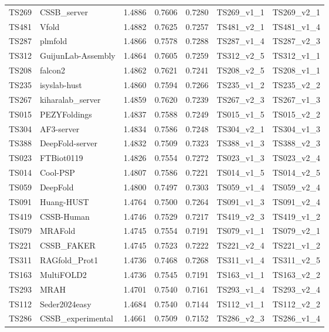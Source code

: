 \begin{table}[ht]
{\begin{tabular}{llrrrll}
TS269 & CSSB\_server & 1.4886 & 0.7606 & 0.7280 & TS269\_v1\_1 & TS269\_v2\_1 \\ 
TS481 & Vfold & 1.4882 & 0.7625 & 0.7257 & TS481\_v2\_1 & TS481\_v1\_4 \\ 
TS287 & plmfold & 1.4866 & 0.7578 & 0.7288 & TS287\_v1\_4 & TS287\_v2\_3 \\ 
TS312 & GuijunLab-Assembly & 1.4864 & 0.7605 & 0.7259 & TS312\_v2\_5 & TS312\_v1\_1 \\ 
TS208 & falcon2 & 1.4862 & 0.7621 & 0.7241 & TS208\_v2\_5 & TS208\_v1\_1 \\ 
TS235 & isyslab-hust & 1.4860 & 0.7594 & 0.7266 & TS235\_v1\_2 & TS235\_v2\_2 \\ 
TS267 & kiharalab\_server & 1.4859 & 0.7620 & 0.7239 & TS267\_v2\_3 & TS267\_v1\_3 \\ 
TS015 & PEZYFoldings & 1.4837 & 0.7588 & 0.7249 & TS015\_v1\_5 & TS015\_v2\_2 \\ 
TS304 & AF3-server & 1.4834 & 0.7586 & 0.7248 & TS304\_v2\_1 & TS304\_v1\_3 \\ 
TS388 & DeepFold-server & 1.4832 & 0.7509 & 0.7323 & TS388\_v1\_3 & TS388\_v2\_3 \\ 
TS023 & FTBiot0119 & 1.4826 & 0.7554 & 0.7272 & TS023\_v1\_3 & TS023\_v2\_4 \\ 
TS014 & Cool-PSP & 1.4807 & 0.7586 & 0.7221 & TS014\_v1\_5 & TS014\_v2\_5 \\ 
TS059 & DeepFold & 1.4800 & 0.7497 & 0.7303 & TS059\_v1\_4 & TS059\_v2\_4 \\ 
TS091 & Huang-HUST & 1.4764 & 0.7500 & 0.7264 & TS091\_v1\_3 & TS091\_v2\_4 \\ 
TS419 & CSSB-Human & 1.4746 & 0.7529 & 0.7217 & TS419\_v2\_3 & TS419\_v1\_2 \\ 
TS079 & MRAFold & 1.4745 & 0.7554 & 0.7191 & TS079\_v1\_1 & TS079\_v2\_1 \\ 
TS221 & CSSB\_FAKER & 1.4745 & 0.7523 & 0.7222 & TS221\_v2\_4 & TS221\_v1\_2 \\ 
TS311 & RAGfold\_Prot1 & 1.4736 & 0.7468 & 0.7268 & TS311\_v1\_4 & TS311\_v2\_5 \\ 
TS163 & MultiFOLD2 & 1.4736 & 0.7545 & 0.7191 & TS163\_v1\_1 & TS163\_v2\_2 \\ 
TS293 & MRAH & 1.4701 & 0.7540 & 0.7161 & TS293\_v1\_4 & TS293\_v2\_4 \\ 
TS112 & Seder2024easy & 1.4684 & 0.7540 & 0.7144 & TS112\_v1\_1 & TS112\_v2\_2 \\ 
TS286 & CSSB\_experimental & 1.4661 & 0.7509 & 0.7152 & TS286\_v2\_3 & TS286\_v1\_4 \\ 

\end{tabular}}
\end{table}
